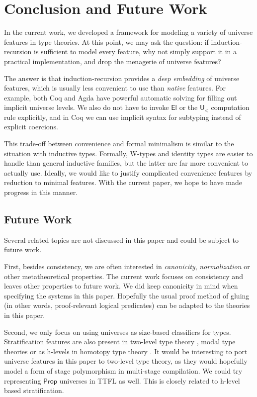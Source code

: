 \documentclass[a4paper,UKenglish,cleveref, autoref, thm-restate]{lipics-v2021}
\theoremstyle{remark}
\theoremstyle{definition}
\newcommand{\U}{\mathsf{U}}
\newcommand{\El}{\mathsf{El}}
\renewcommand{\U}{\mathsf{U}}
\newcommand{\msf}[1]{\mathsf{#1}}
\newcommand{\ult}{\U_{<}}
\begin{document}
\section{Conclusion and Future Work} \label{sec:conclusion}

In the current work, we developed a framework for modeling a variety of universe
features in type theories. At this point, we may ask the question: if
induction-recursion is sufficient to model every feature, why not simply support
it in a practical implementation, and drop the menagerie of universe features?

The answer is that induction-recursion provides a \emph{deep embedding} of
universe features, which is usually less convenient to use than \emph{native}
features. For example, both Coq and Agda have powerful automatic solving for
filling out implicit universe levels. We also do not have to invoke $\El$ or the
$\ult$ computation rule explicitly, and in Coq we can use implicit syntax for
subtyping instead of explicit coercions.

This trade-off between convenience and formal minimalism is similar to the
situation with inductive types. Formally, W-types and identity types are easier
to handle than general inductive families, but the latter are far more
convenient to actually use. Ideally, we would like to justify complicated
convenience features by reduction to minimal features. With the current paper,
we hope to have made progress in this manner.

\subsection{Future Work}

Several related topics are not discussed in this paper and could be subject to
future work.

First, besides consistency, we are often interested in \emph{canonicity},
\emph{normalization} or other metatheoretical properties. The current work
focuses on consistency and leaves other properties to future work. We did keep
canonicity in mind when specifying the systems in this paper. Hopefully the
usual proof method of gluing (in other words, proof-relevant logical predicates)
\cite{coquandnorm,kaposi2019gluing,sterling2019algebraic} can be adapted to the theories in
this paper.

Second, we only focus on using universes as size-based classifiers for
types. Stratification features are also present in two-level type theory
\cite{twolevel}, modal type theories \cite{gratzer20multimodal} or as h-levels
in homotopy type theory \cite{hottbook}. It would be interesting to port
universe features in this paper to two-level type theory, as they would
hopefully model a form of stage polymorphism in multi-stage compilation. We
could try representing $\msf{Prop}$ universes in TTFL as well. This is closely
related to h-level based stratification.
\end{document}
